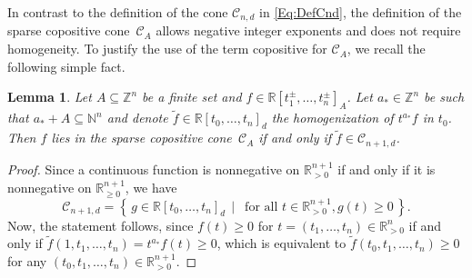 \documentclass[a4paper,11pt]{amsart}
\newtheorem{lemma}[theorem]{Lemma}
\theoremstyle{definition}
\newcommand{\RR}{\mathbb{R}}
\begin{document}
In contrast to the definition of the cone $\mathcal{C}_{n,d}$ in \eqref{Eq:DefCnd}, the definition of the sparse copositive cone~$\mathcal{C}_{A}$ allows negative integer exponents and does not require homogeneity. To justify the use of the term copositive for $\mathcal{C}_{A}$, we recall the following simple fact.

\begin{lemma}
    Let $A \subseteq \mathbb{Z}^n$ be a finite set and $f \in \RR[t_1^\pm,\ldots,t_n^\pm]_A$. Let $a_* \in \mathbb{Z}^n$ be such that $a_* + A \subseteq \mathbb{N}^n$ and denote $\widetilde{f} \in \RR[t_0, \dots, t_n]_d$ the homogenization of $t^{a_*} f$ in $t_0$.
    Then $f$ lies in the sparse copositive cone~$\mathcal{C}_A$ if and only if $\widetilde{f} \in \mathcal{C}_{n+1,d}$.
\end{lemma}

\begin{proof}
   Since a continuous function is nonnegative on $\mathbb{R}_{>0}^{n+1}$ if and only if it is nonnegative on $\mathbb{R}_{\geq0}^{n+1}$, we have 
    \[ \mathcal{C}_{n+1,d} = \left\{\, g \in \mathbb{R}[t_0, \dots , t_n]_d \, \mid \,  \text{ for all } t \in \mathbb{R}^{n+1}_{> 0}, g(t) \geq 0 \,\right\}.\]
    Now, the statement follows, since $f(t) \geq 0$ for $t = (t_1, \dots, t_n) \in \RR^n_{>0}$ if and only if $\widetilde{f}(1,t_1,\dots ,t_n) =  t^{a_*} f(t) \geq 0$, which is equivalent to $\widetilde{f}(t_0,t_1,\dots ,t_n)  \geq 0$ for any $(t_0,t_1,\dots,t_n) \in \mathbb{R}_{>0}^{n+1}$.
\end{proof}
\end{document}
